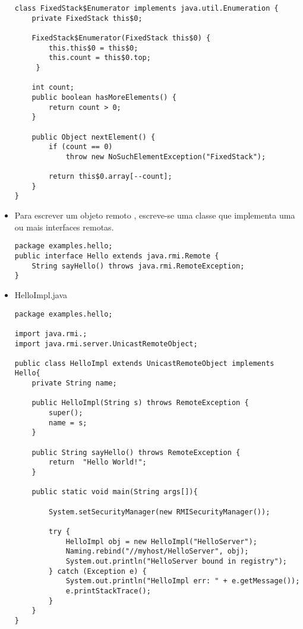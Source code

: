 \begin{itemize}
\begin{lstlisting}
class FixedStack$Enumerator implements java.util.Enumeration {
	private FixedStack this$0;
	
	FixedStack$Enumerator(FixedStack this$0) {
		this.this$0 = this$0;
		this.count = this$0.top;
	 }
			
	int count;
	public boolean hasMoreElements() {
		return count > 0;
	}
		
	public Object nextElement() {
		if (count == 0)
			throw new NoSuchElementException("FixedStack");
		
		return this$0.array[--count];
	}
}
\end{lstlisting}
			
			\clearpage
			\item Para escrever um objeto remoto , escreve-se uma classe que implementa uma ou mais interfaces remotas. 
			
\begin{lstlisting}
package examples.hello;
public interface Hello extends java.rmi.Remote {
	String sayHello() throws java.rmi.RemoteException;
}
\end{lstlisting}
	 
\item HelloImpl.java
\begin{lstlisting}
package examples.hello;

import java.rmi.;
import java.rmi.server.UnicastRemoteObject;

public class HelloImpl extends UnicastRemoteObject implements Hello{
	private String name;
	
	public HelloImpl(String s) throws RemoteException {
		super();
		name = s;
	}
	
	public String sayHello() throws RemoteException {
		return  "Hello World!";
	}
	
	public static void main(String args[]){
	
		System.setSecurityManager(new RMISecurityManager());
	
		try {
			HelloImpl obj = new HelloImpl("HelloServer");
			Naming.rebind("//myhost/HelloServer", obj);
			System.out.println("HelloServer bound in registry");
		} catch (Exception e) {
			System.out.println("HelloImpl err: " + e.getMessage());
			e.printStackTrace();
		}
	}
}
\end{lstlisting}
		\end{itemize}


	\clearpage
